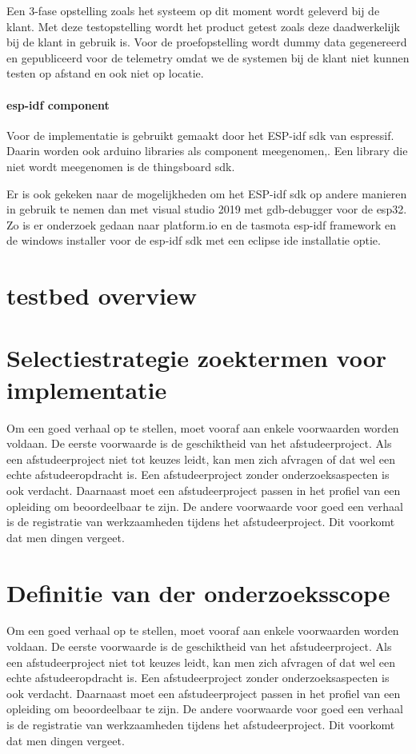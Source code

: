 Een 3-fase opstelling zoals het systeem op dit moment wordt geleverd bij de klant. Met deze testopstelling wordt het product getest zoals deze daadwerkelijk bij de klant in gebruik is. Voor de proefopstelling wordt dummy data gegenereerd en gepubliceerd voor de telemetry omdat we de systemen bij de klant niet kunnen testen op afstand en ook niet op locatie.


\paragraph{esp-idf component}

Voor de implementatie is gebruikt gemaakt door het ESP-idf sdk van espressif. Daarin worden ook arduino libraries als component meegenomen,. Een library die niet wordt meegenomen is de thingsboard sdk.

Er is ook gekeken naar de mogelijkheden om het ESP-idf sdk op andere manieren in gebruik te nemen dan met visual studio 2019 met  gdb-debugger voor de esp32. Zo is er onderzoek gedaan naar platform.io en de tasmota esp-idf framework en de windows installer voor de esp-idf sdk met een eclipse ide installatie optie.

\section{testbed overview}



\begin{center}
\end{center}



\section{Selectiestrategie  zoektermen voor implementatie}
Om een goed verhaal op te stellen, moet vooraf aan enkele voorwaarden
worden voldaan. De eerste voorwaarde is de geschiktheid van het
afstudeerproject. Als een afstudeerproject niet tot keuzes leidt, kan
men zich afvragen of dat wel een echte afstudeeropdracht is. Een
afstudeerproject zonder onderzoeksaspecten is ook verdacht. Daarnaast
moet een afstudeerproject passen in het profiel van een opleiding om
beoordeelbaar te zijn. De andere voorwaarde voor goed een verhaal is
de registratie van werkzaamheden tijdens het afstudeerproject. Dit
voorkomt dat men dingen vergeet.
\section{Definitie van der onderzoeksscope}
Om een goed verhaal op te stellen, moet vooraf aan enkele voorwaarden
worden voldaan. De eerste voorwaarde is de geschiktheid van het
afstudeerproject. Als een afstudeerproject niet tot keuzes leidt, kan
men zich afvragen of dat wel een echte afstudeeropdracht is. Een
afstudeerproject zonder onderzoeksaspecten is ook verdacht. Daarnaast
moet een afstudeerproject passen in het profiel van een opleiding om
beoordeelbaar te zijn. De andere voorwaarde voor goed een verhaal is
de registratie van werkzaamheden tijdens het afstudeerproject. Dit
voorkomt dat men dingen vergeet.

